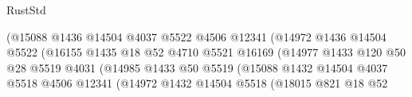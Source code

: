 \begin{lexlean}{RustStd}
\begin{coremodule}
                                              (@15088
                                                @1436
                                                @14504
                                                @4037
                                                @5522
                                                @4506
                                                @12341
                                                (@14972
                                                  @1436
                                                  @14504
                                                  @5522
                                                  (@16155
                                                    @1435
                                                    @18
                                                    @52
                                                    @4710
                                                    @5521
                                                    @16169
                                                    (@14977
                                                      @1433
                                                      @120
                                                      @50
                                                      @28
                                                      @5519
                                                      @4031
                                                      (@14985
                                                        @1433
                                                        @50
                                                        @5519
                                                        (@15088
                                                          @1432
                                                          @14504
                                                          @4037
                                                          @5518
                                                          @4506
                                                          @12341
                                                          (@14972
                                                            @1432
                                                            @14504
                                                            @5518
                                                            (@18015
                                                              @821
                                                              @18
                                                              @52

\end{coremodule}
\end{lexlean}
